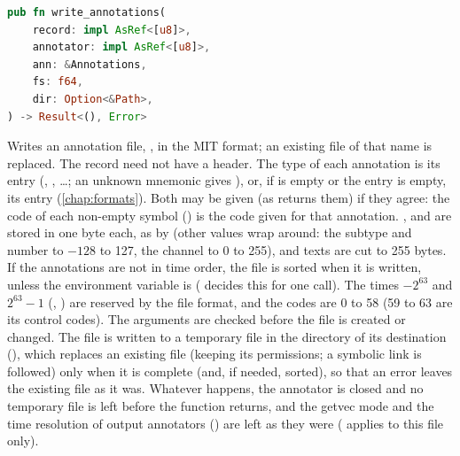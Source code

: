 \begin{lstlisting}[language=Rust,style=signature]
pub fn write_annotations(
    record: impl AsRef<[u8]>,
    annotator: impl AsRef<[u8]>,
    ann: &Annotations,
    fs: f64,
    dir: Option<&Path>,
) -> Result<(), Error>
\end{lstlisting}
Writes an annotation file, , in the MIT format; an existing file of
that name is replaced. The record need not have a header. The type of each annotation
is its  entry (, , \ldots; an unknown mnemonic gives
), or, if  is empty or the entry is empty, its 
entry (\cref{chap:formats}). Both may be given (as  returns them)
if they agree: the code of each non-empty symbol () is the code given for
that annotation. ,  and  are stored in one byte
each, as by  (other values wrap around: the subtype and number to $-128$ to
127, the channel to 0 to 255), and  texts are cut to 255 bytes. If the
annotations are not in time order, the file is sorted when it is written, unless the
environment variable  is  (
decides this for one call). The times $-2^{63}$ and $2^{63}-1$ (,
) are reserved by the file format, and the codes are 0 to 58 (59 to 63 are
its control codes). The arguments are checked before the file is created or changed. The
file is written to a temporary file in the directory of its destination
(), which replaces an existing file (keeping its permissions; a
symbolic link is followed) only when it is complete (and, if needed, sorted), so that an
error leaves the existing file as it was. Whatever happens, the annotator is closed and no
temporary file is left before the function returns, and the getvec mode and the time
resolution of output annotators () are left as they were (
applies to this file only).

